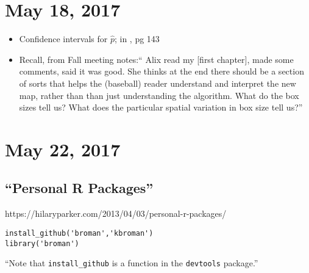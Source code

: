 \documentclass{article}
\begin{document}
\section*{May 18, 2017}
\begin{itemize}
\item Confidence intervals for $\hat{p}$; in \cite{Myers2012}, pg 143
\item Recall, from Fall meeting notes:`` Alix read my [first chapter], made some comments, said it was good. She thinks at the end there should be a section of sorts that helps the (baseball) reader understand and interpret the new map, rather than than just understanding the algorithm. What do the box sizes tell us? What does the particular spatial variation in box size tell us?''
\end{itemize}

\section*{May 22, 2017}



\subsection*{``Personal R Packages''}
https://hilaryparker.com/2013/04/03/personal-r-packages/
\begin{verbatim}
install_github('broman','kbroman')
library('broman')
\end{verbatim}
``Note that \verb|install_github| is a function in the \verb|devtools| package.''
\end{document}
